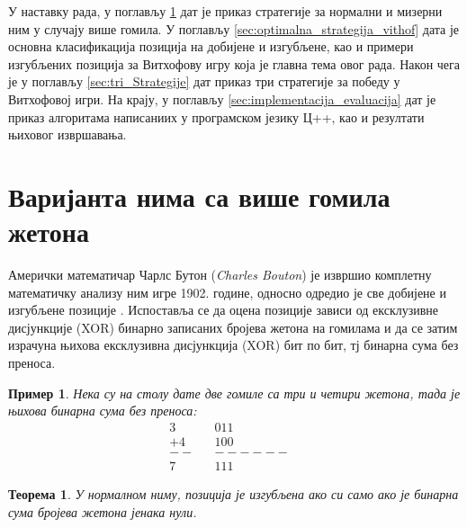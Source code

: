\documentclass[a4paper]{article}
\newtheorem{example}{Пример}
\newtheorem{theorem}{Теорема}
\begin{document}
У наставку рада, у поглављу \ref{sec:optimalna_strategija} дат је приказ стратегије за нормални и мизерни ним у случају више гомила. У поглављу \ref{sec:optimalna_strategija_vithof} дата је основна класификација позиција на добијене и изгубљене, као и примери изгубљених позиција за Витхофову игру која је главна тема овог рада. Након чега је у поглављу \ref{sec:tri_Strategije} дат приказ три стратегије за победу у Витхофовој игри. На крају, у поглављу \ref{sec:implementacija_evaluacija} дат је приказ алгоритама написаниих у програмском језику Ц++, као и резултати њиховог извршавања.

\section{Варијанта нима са више гомила жетона}
\label{sec:optimalna_strategija}

Амерички математичар Чарлс Бутон (\textit{Charles Bouton}) је извршио комплетну математичку анализу ним игре 1902. године, односно одредио је све добијене и изгубљене позиције \cite{carls_buton}. Испоставља се да оцена позиције зависи од ексклузивне дисјункције (XOR) бинарно записаних бројева жетона на гомилама и да се затим израчуна њихова ексклузивна дисјункција (XOR) бит по бит, тј бинарна сума без преноса. 

\begin{example} 
	Нека су на столу дате две гомиле са три и четири жетона, тада је њихова бинарна сума без преноса:	
	\begin{align*}
		3&		& 0 1 1&\\
		+4&		& 1 0 0&\\
		--&		&------&\\
		7&		& 1 1 1&
	\end{align*}
\end{example}

\begin{theorem}
	\label{thm:pobeda}
	У нормалном ниму, позиција је изгубљена ако си само ако је бинарна сума бројева жетона јенака нули.
\end{theorem}
\end{document}
